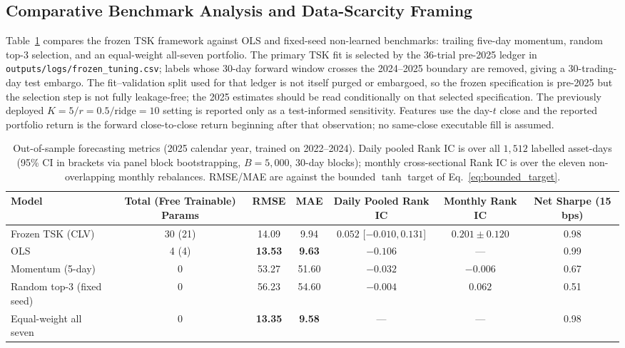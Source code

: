 \documentclass[pdflatex,sn-mathphys-num]{sn-jnl}
\theoremstyle{thmstyleone}
\theoremstyle{thmstyletwo}
\theoremstyle{thmstylethree}
\begin{document}
\subsection{Comparative Benchmark Analysis and Data-Scarcity Framing}\label{subsec4_3}

Table~\ref{tab:benchmark} compares the frozen TSK framework against OLS and fixed-seed non-learned benchmarks: trailing five-day momentum, random top-3 selection, and an equal-weight all-seven portfolio. The primary TSK fit is selected by the 36-trial pre-2025 ledger in \texttt{outputs/logs/frozen\_tuning.csv}; labels whose 30-day forward window crosses the 2024--2025 boundary are removed, giving a 30-trading-day test embargo. The fit--validation split used for that ledger is not itself purged or embargoed, so the frozen specification is pre-2025 but the selection step is not fully leakage-free; the 2025 estimates should be read conditionally on that selected specification. The previously deployed $K=5/r=0.5/\mathrm{ridge}=10$ setting is reported only as a test-informed sensitivity. Features use the day-$t$ close and the reported portfolio return is the forward close-to-close return beginning after that observation; no same-close executable fill is assumed.

\begin{table}[htbp]
\centering
\small
\caption{Out-of-sample forecasting metrics (2025 calendar year, trained on 2022--2024). Daily pooled Rank IC is over all $1{,}512$ labelled asset-days (95\% CI in brackets via panel block bootstrapping, $B=5{,}000$, 30-day blocks); monthly cross-sectional Rank IC is over the eleven non-overlapping monthly rebalances. RMSE/MAE are against the bounded $\tanh$ target of Eq.~\eqref{eq:bounded_target}.}
\label{tab:benchmark}
\begin{tabular}{@{}lcccccc@{}}
\toprule
\textbf{Model} & \textbf{Total (Free Trainable) Params} & \textbf{RMSE} & \textbf{MAE} & \textbf{Daily Pooled Rank IC} & \textbf{Monthly Rank IC} & \textbf{Net Sharpe (15 bps)} \\
\midrule
Frozen TSK (CLV) & 30 (21)        & 14.09          & 9.94           & $0.052$ [$-0.010, 0.131$] & $0.201 \pm 0.120$ & 0.98 \\
OLS                & 4 (4)          & \textbf{13.53} & \textbf{9.63}  & $-0.106$                & --- & 0.99 \\
Momentum (5-day) & 0             & 53.27          & 51.60          & $-0.032$                 & $-0.006$ & 0.67 \\
Random top-3 (fixed seed) & 0       & 56.23          & 54.60          & $-0.004$                 & $0.062$ & 0.51 \\
Equal-weight all seven & 0          & \textbf{13.35} & \textbf{9.58}  & ---                 & --- & 0.98 \\
\bottomrule
\end{tabular}
\end{table}
\end{document}
